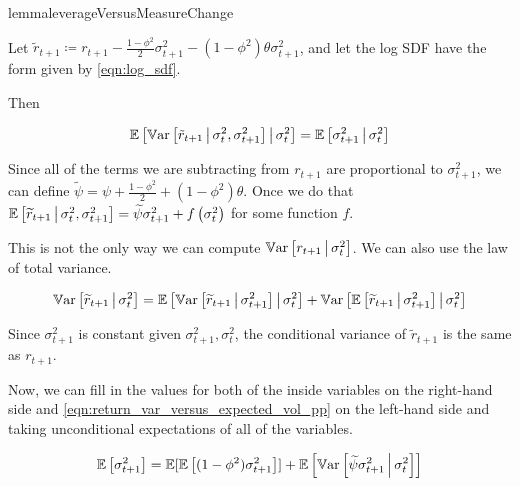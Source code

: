 \documentclass[11pt, letterpaper, twoside, final]{article}
\begin{document}
\begin{restatable}{lemma}{leverageVersusMeasureChange}

    Let $\tilde{r}_{t+1} \coloneqq r_{t+1} - \frac{1 - \phi^2}{2} \sigma^2_{t+1} - (1 - \phi^2) \theta
    \sigma^2_{t+1}$, and let the log SDF have the form given by \cref{eqn:log_sdf}.
    
    Then 
    
    \begin{equation}
        \operatorname{\mathbb{E}}\left[\operatorname{\mathbb{V}ar}\left[\tilde{r}_{t+1} \,\middle\vert\, \sigma^2_t, \sigma^2_{t+1}\right] \,\middle\vert\, \sigma^2_t\right]   =
        \operatorname{\mathbb{E}}\left[\sigma^2_{t+1} \,\middle\vert\, \sigma^2_t\right]
    \end{equation}
\end{restatable}

Since all of the terms we are subtracting from $r_{t+1}$ are proportional to $\sigma^2_{t+1}$, we can define
$\widetilde{\psi} = \psi + \frac{1-\phi^2}{2} + (1 - \phi^2)\theta$.
Once we do that  $\operatorname{\mathbb{E}}\left[\widetilde{r}_{t+1} \,\middle\vert\, \sigma^2_t, \sigma^2_{t+1} \right] = \widetilde{\psi}
\sigma^2_{t+1} + f\left(\sigma^2_t\right)$ for some function $f$.

This is not the only way we can compute $\operatorname{\mathbb{V}ar}\left[r_{t+1} \,\middle\vert\, \sigma^2_t \right]$.
We can also use the law of total variance.

\begin{equation}
    \operatorname{\mathbb{V}ar}\left[\widetilde{r}_{t+1} \,\middle\vert\, \sigma^2_t\right]  =
    \operatorname{\mathbb{E}}\left[\operatorname{\mathbb{V}ar}\left[\widetilde{r}_{t+1} \,\middle\vert\, \sigma^2_{t+1}\right] \,\middle\vert\, \sigma_t^2 \right] +
    \operatorname{\mathbb{V}ar}\left[\operatorname{\mathbb{E}}\left[\widetilde{r}_{t+1}\,\middle\vert\, \sigma_{t+1}^2\right] \,\middle\vert\, \sigma^2_t\right]
\end{equation}

Since $\sigma^2_{t+1}$ is constant given $\sigma^2_{t+1}, \sigma^2_t$, the conditional variance of
$\widetilde{r}_{t+1}$ is the same as $r_{t+1}$.

Now, we can fill in the values for both of the inside variables on the right-hand side and
\cref{eqn:return_var_versus_expected_vol_pp} on the left-hand side and taking unconditional expectations of all of
the variables.

\begin{equation}
    \operatorname{\mathbb{E}}\left[\sigma^2_{t+1} \right]  = \operatorname{\mathbb{E}}[ \operatorname{\mathbb{E}}\left[(1 - \phi^2) \sigma^2_{t+1} \right]] +
    \operatorname{\mathbb{E}}\left[\operatorname{\mathbb{V}ar}\left[\widetilde{\psi} \sigma^2_{t+1} \,\middle\vert\, \sigma^2_t\right]\right] 
\end{equation}
\end{document}
